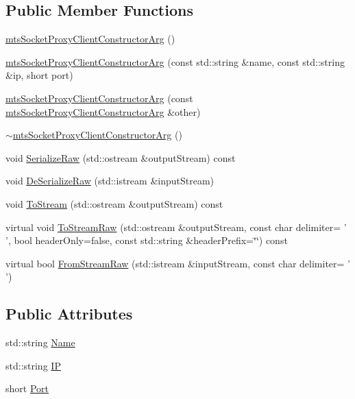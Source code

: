 \subsection*{Public Member Functions}
\begin{DoxyCompactItemize}
\item 
\hyperlink{classmts_socket_proxy_client_constructor_arg_af51660ccafe56eeb565f3c27aa341449}{mts\-Socket\-Proxy\-Client\-Constructor\-Arg} ()
\item 
\hyperlink{classmts_socket_proxy_client_constructor_arg_a9e6bd3ba5efa99aca6a727916ccc57dc}{mts\-Socket\-Proxy\-Client\-Constructor\-Arg} (const std\-::string \&name, const std\-::string \&ip, short port)
\item 
\hyperlink{classmts_socket_proxy_client_constructor_arg_a7b2fd4ef0cf1cce813c50b28ac9432c6}{mts\-Socket\-Proxy\-Client\-Constructor\-Arg} (const \hyperlink{classmts_socket_proxy_client_constructor_arg}{mts\-Socket\-Proxy\-Client\-Constructor\-Arg} \&other)
\item 
\hyperlink{classmts_socket_proxy_client_constructor_arg_a840ba0189021c3c87a7ce00fb632f5ea}{$\sim$mts\-Socket\-Proxy\-Client\-Constructor\-Arg} ()
\item 
void \hyperlink{classmts_socket_proxy_client_constructor_arg_a78bcddca08cafa20178c9198ac5eef13}{Serialize\-Raw} (std\-::ostream \&output\-Stream) const 
\item 
void \hyperlink{classmts_socket_proxy_client_constructor_arg_aaf7769aff584dabc42a6c2441c112926}{De\-Serialize\-Raw} (std\-::istream \&input\-Stream)
\item 
void \hyperlink{classmts_socket_proxy_client_constructor_arg_a02f856f05495f0218b0a4c9dddd23468}{To\-Stream} (std\-::ostream \&output\-Stream) const 
\item 
virtual void \hyperlink{classmts_socket_proxy_client_constructor_arg_a3b8e88637fd8afe325d30bf365e1e612}{To\-Stream\-Raw} (std\-::ostream \&output\-Stream, const char delimiter= ' ', bool header\-Only=false, const std\-::string \&header\-Prefix=\char`\"{}\char`\"{}) const 
\item 
virtual bool \hyperlink{classmts_socket_proxy_client_constructor_arg_a2ec5f27563b8deef6677e915543dba80}{From\-Stream\-Raw} (std\-::istream \&input\-Stream, const char delimiter= ' ')
\end{DoxyCompactItemize}
\subsection*{Public Attributes}
\begin{DoxyCompactItemize}
\item 
std\-::string \hyperlink{classmts_socket_proxy_client_constructor_arg_a750e2b218eac14034166d2c4614cd2bf}{Name}
\item 
std\-::string \hyperlink{classmts_socket_proxy_client_constructor_arg_a86c3db84d1fd5663615915a4aa455845}{I\-P}
\item 
short \hyperlink{classmts_socket_proxy_client_constructor_arg_ab036fe588319de186ec63d6cf4900bc7}{Port}
\end{DoxyCompactItemize}


